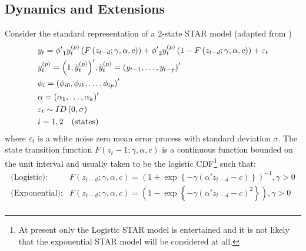 \subsection{Dynamics and Extensions}
Consider the standard representation of a 2-state STAR model (adapted from
\cite{Dijk1999})
\begin{equation}\label{eq:star_original}
\begin{gathered}
  {y_t} = {{\phi '}_1}y_t^{\left( p \right)}\left( {F\left( {{z_{t - d}};\gamma ,\alpha ,c} \right)} \right) + {{\phi '}_2}y_t^{\left( p \right)}\left( {1 - F\left( {{z_{t - d}};\gamma ,\alpha ,c} \right)} \right) + {\varepsilon _t} \hfill \\
  y_t^{\left( p \right)} = {\left( {1,\tilde y_t^{\left( p \right)}} \right)^\prime },\tilde y_t^{\left( p \right)} = {\left( {{y_{t - 1}}, \ldots ,{y_{t - p}}} \right)^\prime } \hfill \\
  {\phi _i} = {\left( {{\phi _{i0}},{\phi _{i1}}, \ldots ,{\phi _{ip}}} \right)^\prime } \hfill \\
  \alpha  = {\left( {{\alpha _1}, \ldots ,{\alpha _k}} \right)^\prime }\hfill \\
  {\varepsilon _t} \sim ID\left( {0,\sigma } \right) \hfill \\
  i = 1,2 \quad \text{(states)} \hfill \\
\end{gathered}
\end{equation}
where $\varepsilon_t$ is a white noise zero mean error process with standard
deviation $\sigma$. The state transition function $F\left( {{z_t-1};\gamma
,\alpha ,c} \right)$ is a continuous function bounded on the unit interval and 
usually taken to be the logistic CDF\footnote{At present only the Logistic STAR 
model is entertained and it is not likely that the exponential STAR model will
be  considered at all.} such that:
\begin{equation}\label{eq:logistic_cdf}
\begin{split}
\text{(Logistic):} &F\left( {{z_{t-d}};\gamma ,\alpha ,c} \right) = {\left( {1 + \exp \left\{ { -
\gamma \left( {\alpha '{z_{t-d}} - c} \right)} \right\}} \right)}^{ - 1},\gamma  > 0\\
\text{(Exponential):}&F\left( {{z_{t-d}};\gamma ,\alpha ,c} \right) = {\left( {1 - \exp \left\{ { -
\gamma \left( {\alpha '{z_{t-d}} - c} \right)}^2 \right\}} \right)},\gamma  >
0\\
\end{split}
\end{equation}

